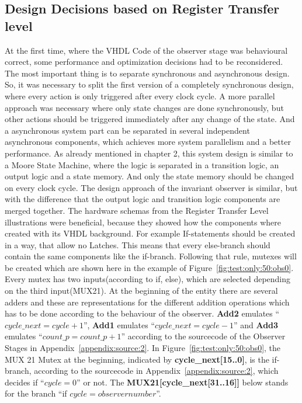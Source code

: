 \subsection{Design Decisions based on Register Transfer level}
\label{chapter:3:section:sub:3}
At the first time, where the VHDL Code of the observer stage was behavioural correct, some performance and optimization decisions had to be reconsidered. 
The most important thing is to separate synchronous and asynchronous design. So, it was necessary to split the first version of a completely synchronous design, where
every action is only triggered after every clock cycle. A more parallel approach was necessary where only state changes are done synchronously, but other actions should
be triggered immediately after any change of the state. And a asynchronous system part can be separated in several independent asynchronous components, which achieves more 
system parallelism and a better performance. As already mentioned in  chapter 2, this system design is similar to a Moore State Machine, where the logic 
is separated in a transition logic, an output logic and a state memory. And only the state memory should be changed on every clock cycle.
The design approach of the invariant observer is similar, but with the difference that the output logic and transition logic components are merged together. 
The hardware schemas from the Register Transfer Level illustrations were beneficial, because they showed how the components where created with its VHDL background. 
For example If-statements should be created in a way, that allow no Latches. This means that every else-branch should contain the same components like the if-branch. 
Following that rule, mutexes will be created which are shown here in the example of Figure~\ref{fig:test:only:50:obs0}. Every mutex has two inputs(according to if, else), which are
selected depending on the third input(MUX21).
At the beginning of the entity there are several adders and these are representations for the different addition operations
which has to be done according to the behaviour of the observer. \textbf{Add2} emulates ``$cycle\_next=cycle+1$'', \textbf{Add1} emulates ``$cycle\_next=cycle-1$'' and \textbf{Add3}
emulates ``$count\_p=count\_p+1$'' according to the sourcecode of the Observer Stages in Appendix~\ref{appendix:source:2}. 
In Figure~\ref{fig:test:only:50:obs0}, the MUX 21 Mutex at the beginning, indicated by \textbf{cycle\_next[15..0]}, is the if-branch, according to the sourcecode in Appendix~\ref{appendix:source:2}, 
which decides if ``$cycle=0$'' or not.
The \textbf{MUX21[cycle\_next[31..16]]} below stands for the branch ``if $cycle=observernumber$''. 
